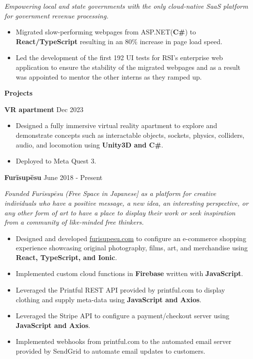 \documentclass[10pt]{article}
\begin{document}
\textit{Empowering local and state governments with the only cloud-native SaaS platform for government revenue processing.}

\vspace{1pt}

\begin{itemize}[noitemsep]
    \item Migrated slow-performing webpages from ASP.NET(\textbf{C\#}) to \textbf{React/TypeScript} resulting in an 80\% increase in page load speed.
    \item Led the development of the first 192 UI tests for RSI's enterprise web application to ensure the stability of the migrated webpages and as a result was appointed to mentor the other interns as they ramped up.
\end{itemize}

\begin{center}
    \textbf{Projects}
    \hrulefill
\end{center}

\textbf{VR apartment} \hfill Dec 2023
\begin{itemize}[noitemsep]
    \item Designed a fully immersive virtual reality apartment to explore and demonstrate concepts such as interactable objects,
    sockets, physics, colliders, audio, and locomotion using \textbf{Unity3D and C\#}. 
    \item Deployed to Meta Quest 3.
\end{itemize}

\textbf{Furīsupēsu} \hfill June 2018 - Present

\textit{Founded Furīsupēsu (Free Space in Japanese] as a platform for creative individuals who have a positive message, a new idea, an interesting perspective, or any other form of art to have a place to display their work or seek inspiration from a community of like-minded free thinkers.}
\begin{itemize}[noitemsep]
    \item Designed and developed \href{https://furisupesu.com/}{furisupesu.com} to configure 
    an e-commerce shopping experience showcasing original photography, films, art, and merchandise using \textbf{React, TypeScript, and Ionic}.
    
    \item Implemented custom cloud functions in \textbf{Firebase} written with \textbf{JavaScript}.
    
    \item Leveraged the Printful REST API provided by printful.com to display clothing and supply meta-data using \textbf{JavaScript and Axios}. 
    
    \item Leveraged the Stripe API to configure a payment/checkout server using \textbf{JavaScript and Axios}.
    
    \item Implemented webhooks from printful.com to the automated email server provided by SendGrid to automate email updates to customers.
\end{itemize}
\end{document}
